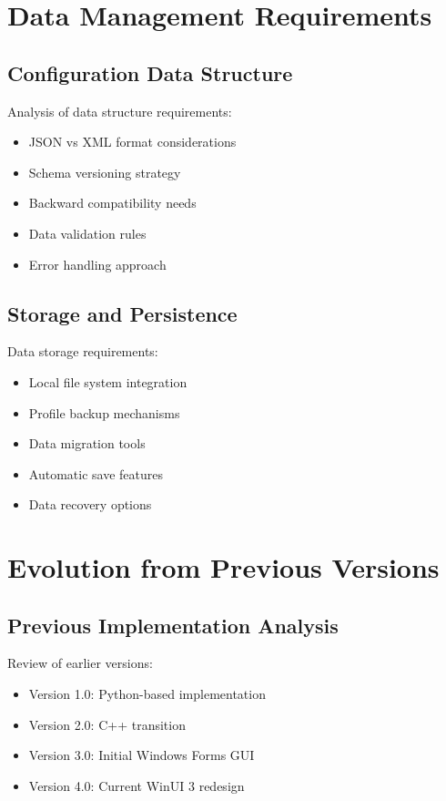 \section{Data Management Requirements}
\subsection{Configuration Data Structure}
Analysis of data structure requirements:
\begin{itemize}
    \item JSON vs XML format considerations
    \item Schema versioning strategy
    \item Backward compatibility needs
    \item Data validation rules
    \item Error handling approach
\end{itemize}

\subsection{Storage and Persistence}
Data storage requirements:
\begin{itemize}
    \item Local file system integration
    \item Profile backup mechanisms
    \item Data migration tools
    \item Automatic save features
    \item Data recovery options
\end{itemize}

\section{Evolution from Previous Versions}
\subsection{Previous Implementation Analysis}
Review of earlier versions:
\begin{itemize}
    \item Version 1.0: Python-based implementation
    \item Version 2.0: C++ transition
    \item Version 3.0: Initial Windows Forms GUI
    \item Version 4.0: Current WinUI 3 redesign
\end{itemize}

